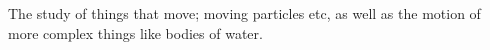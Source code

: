 The study of things that move; moving particles etc, as well as the
motion of more complex things like bodies of water.